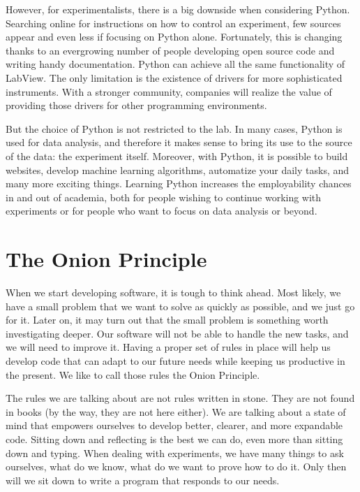 However, for experimentalists, there is a big downside when considering Python. Searching online for instructions on how to control an experiment, few sources appear and even less if focusing on Python alone. Fortunately, this is changing thanks to an evergrowing number of people developing open source code and writing handy documentation. Python can achieve all the same functionality of LabView. The only limitation is the existence of drivers for more sophisticated instruments. With a stronger community, companies will realize the value of providing those drivers for other programming environments.

But the choice of Python is not restricted to the lab. In many cases, Python is used for data analysis, and therefore it makes sense to bring its use to the source of the data: the experiment itself. Moreover, with Python, it is possible to build websites, develop machine learning algorithms, automatize your daily tasks, and many more exciting things. Learning Python increases the employability chances in and out of academia, both for people wishing to continue working with experiments or for people who want to focus on data analysis or beyond.

\section{The Onion Principle}\label{section:onion-principle}
When we start developing software, it is tough to think ahead. Most likely, we have a small problem that we want to solve as quickly as possible, and we just go for it. Later on, it may turn out that the small problem is something worth investigating deeper. Our software will not be able to handle the new tasks, and we will need to improve it. Having a proper set of rules in place will help us develop code that can adapt to our future needs while keeping us productive in the present. We like to call those rules the Onion Principle.

The rules we are talking about are not rules written in stone. They are not found in books (by the way, they are not here either). We are talking about a state of mind that empowers ourselves to develop better, clearer, and more expandable code. Sitting down and reflecting is the best we can do, even more than sitting down and typing. When dealing with experiments, we have many things to ask ourselves, what do we know, what do we want to prove how to do it. Only then will we sit down to write a program that responds to our needs.

